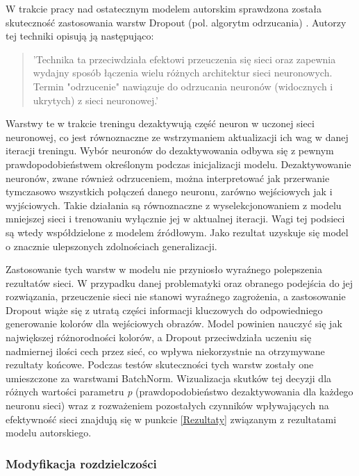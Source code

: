   W trakcie pracy nad ostatecznym modelem autorskim sprawdzona została
  skuteczność zastosowania warstw Dropout (pol. algorytm odrzucania) \cite{dropout}.
  Autorzy tej techniki opisują ją następująco:
  \begin{quote}
    'Technika ta przeciwdziała efektowi przeuczenia się sieci oraz zapewnia wydajny
    sposób łączenia wielu różnych architektur sieci neuronowych. Termin "odrzucenie"
    nawiązuje do odrzucania neuronów (widocznych i ukrytych) z sieci neuronowej.'
  \end{quote}
  Warstwy te w trakcie treningu dezaktywują część neuron w uczonej sieci neuronowej,
  co jest równoznaczne ze wstrzymaniem aktualizacji ich wag w danej iteracji treningu.
  Wybór neuronów do dezaktywowania odbywa się z pewnym prawdopodobieństwem określonym
  podczas inicjalizacji modelu. Dezaktywowanie neuronów, zwane również odrzuceniem,
  można interpretować jak przerwanie tymczasowo wszystkich połączeń danego neuronu,
  zarówno wejściowych jak i wyjściowych.
  Takie działania są równoznaczne z wyselekcjonowaniem z modelu
  mniejszej sieci i trenowaniu wyłącznie jej w aktualnej iteracji. Wagi tej
  podsieci są wtedy współdzielone z modelem źródłowym.
  Jako rezultat uzyskuje się model o znacznie ulepszonych zdolnościach generalizacji.

  Zastosowanie tych warstw w modelu nie przyniosło wyraźnego polepszenia rezultatów
  sieci. W przypadku danej problematyki oraz obranego podejścia do jej rozwiązania,
  przeuczenie sieci nie stanowi wyraźnego zagrożenia, a zastosowanie Dropout
  wiąże się z utratą części informacji kluczowych do odpowiedniego
  generowanie kolorów dla wejściowych obrazów. Model powinien nauczyć się jak
  największej różnorodności kolorów, a Dropout przeciwdziała uczeniu się
  nadmiernej ilości cech przez sieć, co wpływa niekorzystnie na otrzymywane
  rezultaty końcowe. Podczas testów skuteczności tych warstw zostały one umieszczone
  za warstwami BatchNorm. Wizualizacja skutków tej decyzji dla różnych wartości
  parametru \textit{p} (prawdopodobieństwo dezaktywowania dla każdego neuronu sieci)
  wraz z rozważeniem
  pozostałych czynników wpływających na efektywność sieci znajdują się w
  punkcie \ref{Rezultaty} związanym z rezultatami modelu autorskiego.

\subsubsection{Modyfikacja rozdzielczości}

